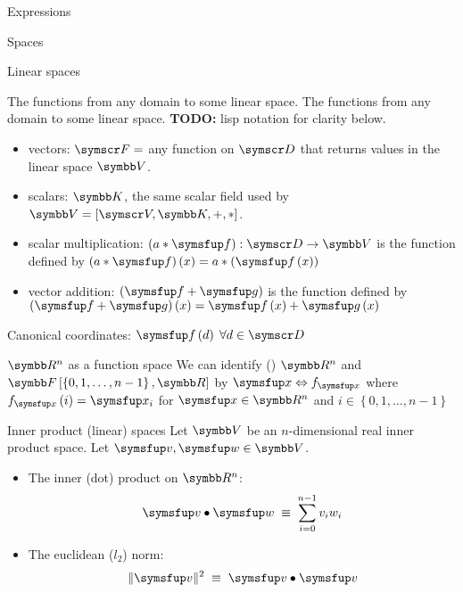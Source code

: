 \documentclass[12pt]{PalisadesLakesArticle}
\begin{document}
\begin{plSection}{Expressions}
\begin{plSection}{Spaces}
\begin{plSection}{Linear spaces}
\begin{plExample}{The functions from any domain to some linear space.}{}
The functions from any domain to some linear space.
\textbf{TODO:} lisp notation for clarity below.
\begin{itemize}
  \item vectors: $\Set{F} = $ any function on $\Set{D}$
  that returns values in the linear space $\Space{V}$.
  \item scalars: $\Space{K}$, the same scalar field used by
  $\Space{V}=\left[ \Set{V}, \Space{K}, +, * \right]$.
  \item scalar multiplication:
  $ \left(a*\Vector{f}\right) : \Set{D} \rightarrow \Space{V}$
  is the function defined by
   $ \left(a*\Vector{f}\right) (x)
   = a*\left(\Vector{f}\left( x \right) \right) $
  \item vector addition:
  $\left( \Vector{f} + \Vector{g} \right) $
  is the function defined by
  $\left( \Vector{f} + \Vector{g} \right) \left( x \right) =
  \Vector{f} \left( x \right) + \Vector{g} \left( x\right)$
\end{itemize}
Canonical coordinates: 
$\Vector{f}\left( d \right) \; \forall d \in \Set{D}$
\end{plExample}

\begin{plExample}{{ $\Space{R}^n$ as a function space }}{}
We can identify 
() 
$\Space{R}^n$ and 
$ \Space{F} \left[ \left\{ 0, 1, \ldots, {n-1} \right\}, \Space{R} \right] $
by
$\Vector{x} \Leftrightarrow f_{\Vector{x}}$
where $f_{\Vector{x}} \left( i \right) = \Vector{x}_i$
for $\Vector{x} \in \Space{R}^n$ and 
$i \in \left\{ 0, 1, \ldots, {n-1} \right\}$
\end{plExample}

\begin{plSection}{Inner product (linear) spaces}
Let $\Space{V}$ be an $n$-dimensional real inner product space.
Let $\Vector{v}, \Vector{w} \in \Space{V}$.

\begin{itemize}
\item The inner (dot) product on $\Reals^n$:
\begin{equation}
\Vector{v} \bullet \Vector{w} \; \equiv \; \sum_{i=0}^{n-1} v_i w_i
\end{equation}

\item The euclidean ($l_2$) norm:
\begin{equation}
\| \Vector{v} \|^2 \; \equiv \; \Vector{v} \bullet \Vector{v}
\end{equation}


\end{itemize}
\end{plSection}
\end{plSection}
\end{plSection}
\end{plSection}
\end{document}
